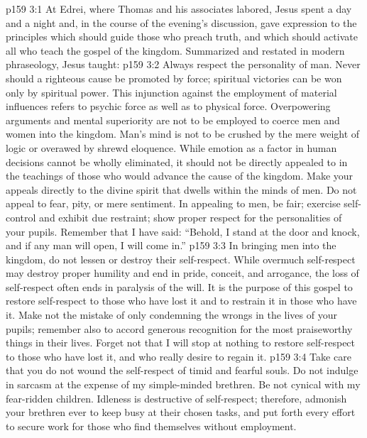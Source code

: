 \vs p159 3:1 At Edrei, where Thomas and his associates labored, Jesus spent a day and a night and, in the course of the evening’s discussion, gave expression to the principles which should guide those who preach truth, and which should activate all who teach the gospel of the kingdom. Summarized and restated in modern phraseology, Jesus taught:
\pc \vs p159 3:2 Always respect the personality of man. Never should a righteous cause be promoted by force; spiritual victories can be won only by spiritual power. This injunction against the employment of material influences refers to psychic force as well as to physical force. Overpowering arguments and mental superiority are not to be employed to coerce men and women into the kingdom. Man’s mind is not to be crushed by the mere weight of logic or overawed by shrewd eloquence. While emotion as a factor in human decisions cannot be wholly eliminated, it should not be directly appealed to in the teachings of those who would advance the cause of the kingdom. Make your appeals directly to the divine spirit that dwells within the minds of men. Do not appeal to fear, pity, or mere sentiment. In appealing to men, be fair; exercise self\hyp{}control and exhibit due restraint; show proper respect for the personalities of your pupils. Remember that I have said: \textcolor{ubdarkred}{“Behold, I stand at the door and knock, and if any man will open, I will come in.”}
\vs p159 3:3 In bringing men into the kingdom, do not lessen or destroy their self\hyp{}respect. While overmuch self\hyp{}respect may destroy proper humility and end in pride, conceit, and arrogance, the loss of self\hyp{}respect often ends in paralysis of the will. It is the purpose of this gospel to restore self\hyp{}respect to those who have lost it and to restrain it in those who have it. Make not the mistake of only condemning the wrongs in the lives of your pupils; remember also to accord generous recognition for the most praiseworthy things in their lives. Forget not that I will stop at nothing to restore self\hyp{}respect to those who have lost it, and who really desire to regain it.
\vs p159 3:4 Take care that you do not wound the self\hyp{}respect of timid and fearful souls. Do not indulge in sarcasm at the expense of my simple\hyp{}minded brethren. Be not cynical with my fear\hyp{}ridden children. Idleness is destructive of self\hyp{}respect; therefore, admonish your brethren ever to keep busy at their chosen tasks, and put forth every effort to secure work for those who find themselves without employment.
